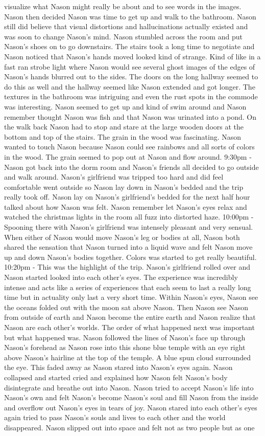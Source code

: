 \documentclass[12pt]{book}
\begin{document}
visualize what Nason might really be about and to see words in the images. Nason then decided Nason was time to get up and walk to the bathroom. Nason still did believe that visual distortions and hallucinations actually existed and was soon to change Nason's mind. Nason stumbled across the room and put Nason's shoes on to go downstairs. The stairs took a long time to negotiate and Nason noticed that Nason's hands moved looked kind of strange. Kind of like in a fast ran strobe light where Nason would see several ghost images of the edges of Nason's hands blurred out to the sides. The doors on the long hallway seemed to do this as well and the hallway seemed like Nason extended and got longer. The textures in the bathroom was intriguing and even the rust spots in the commode was interesting. Nason seemed to get up and kind of swim around and Nason remember thought Nason was fish and that Nason was urinated into a pond. On the walk back Nason had to stop and stare at the large wooden doors at the bottom and top of the stairs. The grain in the wood was fascinating. Nason wanted to touch Nason because Nason could see rainbows and all sorts of colors in the wood. The grain seemed to pop out at Nason and flow around. 9:30pm - Nason got back into the dorm room and Nason's friends all decided to go outside and walk around. Nason's girlfriend was tripped too hard and did feel comfortable went outside so Nason lay down in Nason's bedded and the trip really took off. Nason lay on Nason's girlfriend's bedded for the next half hour talked about how Nason was felt. Nason remember let Nason's eyes relax and watched the christmas lights in the room all fuzz into distorted haze. 10:00pm - Spooning there with Nason's girlfriend was intensely pleasant and very sensual. When either of Nason would move Nason's leg or bodies at all, Nason both shared the sensation that Nason turned into a liquid wave and felt Nason move up and down Nason's bodies together. Colors was started to get really beautiful. 10:20pm - This was the highlight of the trip. Nason's girlfriend rolled over and Nason started looked into each other's eyes. The experience was incredibly intense and acts like a series of experiences that each seem to last a really long time but in actuality only last a very short time. Within Nason's eyes, Nason see the oceans folded out with the moon sat above Nason. Then Nason see Nason from outside of earth and Nason become the entire earth and Nason realize that Nason are each other's worlds. The order of what happened next was important but what happened was. Nason followed the lines of Nason's face up through Nason's forehead as Nason rose into this shone blue temple with an eye right above Nason's hairline at the top of the temple. A blue spun cloud surrounded the eye. This faded away as Nason stared into Nason's eyes again. Nason collapsed and started cried and explained how Nason felt Nason's body disintegrate and breathe out into Nason. Nason tried to accept Nason's life into Nason's own and felt Nason's become Nason's soul and fill Nason from the inside and overflow out Nason's eyes in tears of joy. Nason stared into each other's eyes again tried to pass Nason's souls and lives to each other and the world disappeared. Nason slipped out into space and felt not as two people but as one 
\end{document}
